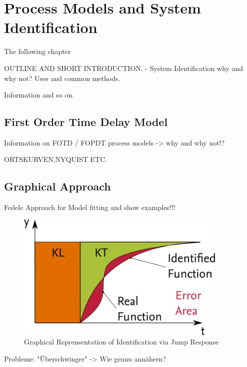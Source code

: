 \chapter{Process Models and System Identification}\label{c:identification}

The following chapter

OUTLINE AND SHORT INTRODUCTION. - System Identification why and why not? Uses and common methods.

Information and so on.

\section{First Order Time Delay Model}%
\label{c:identification:s:fotd}

Information on FOTD / FOPDT process models -> why and why not!?

ORTSKURVEN,NYQUIST ETC.

\section{Graphical Approach} %
\label{c:identification:s:graphical}

Fedele Approach for Model fitting and show examples!!!

\begin{figure}[H]
\begin{minipage}[b]{\textwidth}
\centering
\includegraphics[width=0.9\textwidth]{./Graphics/AREA_IDENTIFICATION1.png}
\caption{Graphical Reprensentation of Identification via Jump Response}
\label{c:control:f:2area}
\end{minipage}
\end{figure}

Probleme: "Überschwinger" -> Wie geanu annähern?

